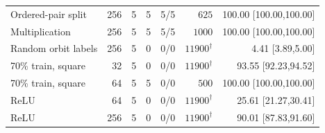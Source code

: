 \begin{tabular}{lrrrrrr}
Ordered-pair split & 256 & 5 & 5 & 5/5 & $625$ & 100.00 [100.00,100.00] \\
Multiplication & 256 & 5 & 5 & 5/5 & $1000$ & 100.00 [100.00,100.00] \\
Random orbit labels & 256 & 5 & 0 & 0/0 & $11900^{\dagger}$ & 4.41 [3.89,5.00] \\
70\% train, square & 32 & 5 & 0 & 0/0 & $11900^{\dagger}$ & 93.55 [92.23,94.52] \\
70\% train, square & 64 & 5 & 5 & 0/0 & $500$ & 100.00 [100.00,100.00] \\
ReLU & 64 & 5 & 0 & 0/0 & $11900^{\dagger}$ & 25.61 [21.27,30.41] \\
ReLU & 256 & 5 & 0 & 0/0 & $11900^{\dagger}$ & 90.01 [87.83,91.60] \\
\bottomrule
\end{tabular}
